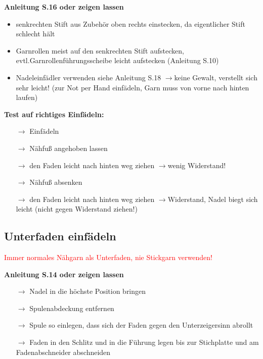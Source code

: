 \documentclass{\basedir/fablab-document}
\newcommand{\pfeil}{\ensuremath{\rightarrow}}
\begin{document}
\textbf{Anleitung S.16 oder zeigen lassen}
\begin{itemize}
 \item senkrechten Stift aus Zubehör oben rechts einstecken, da eigentlicher Stift schlecht hält
 \item Garnrollen meist auf den senkrechten Stift aufstecken, evtl.Garnrollenführungsscheibe leicht aufstecken (Anleitung S.10)
 \item Nadeleinfädler verwenden siehe Anleitung S.18 \pfeil keine Gewalt, verstellt sich sehr leicht! (zur Not per Hand einfädeln, Garn muss von vorne nach hinten laufen)
\end{itemize}

\vspace{2em}

\textbf{Test auf richtiges Einfädeln:}
\begin{itemize}
 \item[\pfeil] Einfädeln
 \item[\pfeil] Nähfuß angehoben lassen
 \item[\pfeil] den Faden leicht nach hinten weg ziehen \pfeil wenig Widerstand!
 \item[\pfeil] Nähfuß absenken
 \item[\pfeil] den Faden leicht nach hinten weg ziehen \pfeil Widerstand, Nadel biegt sich leicht (nicht gegen Widerstand ziehen!)
\end{itemize}

\subsection{Unterfaden einfädeln}
\textcolor{red}{Immer normales Nähgarn als Unterfaden, nie Stickgarn verwenden!}

\vspace{1em}
\textbf{Anleitung S.14 oder zeigen lassen}
\begin{itemize}
 \item[\pfeil] Nadel in die höchste Position bringen
 \item[\pfeil] Spulenabdeckung entfernen
 \item[\pfeil] Spule so einlegen, dass sich der Faden gegen den Unterzeigersinn abrollt
 \item[\pfeil] Faden in den Schlitz und in die Führung legen bis zur Stichplatte und am Fadenabschneider abschneiden
\end{itemize}
\end{document}
